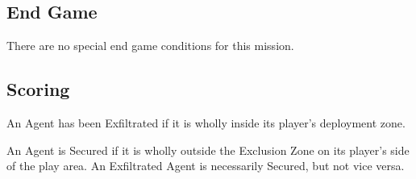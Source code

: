 
\subsection{End Game}

There are no special end game conditions for this mission.

\subsection{Scoring}

  An Agent has been Exfiltrated if it is
wholly inside its player's deployment zone.

  An Agent is Secured if it is wholly outside
the Exclusion Zone on its player's side of the play area.  An
Exfiltrated Agent is necessarily Secured, but not vice versa.

